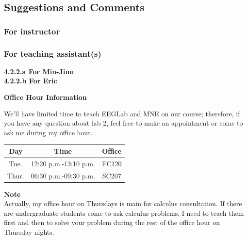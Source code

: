 \documentclass[a4 paper]{article}
\begin{document}
\subsection{Suggestions and Comments}
\subsubsection{For instructor}
\subsubsection{For teaching assistant(s)}
\textbf{4.2.2.a For Min-Jiun}\\
\textbf{4.2.2.b For Eric}\\
\noindent{\color{LightRubineRed} \rule{\linewidth}{0.5mm}}
\begin{center}
    \large{\textbf{Office Hour Information}}
\end{center}
\par We'll have limited time to teach EEGLab and MNE on our course; therefore, if you have any question about lab 2, feel free to make an appointment or come to ask me during my office hour.\\
\begin{center}
    \begin{tabular}{||c|c|c||}
    \hline
    Day & Time & Office\\
        \hline\hline
          Tue. & 12:20 p.m.-13:10 p.m. & EC120 \\
          \hline
          Thur. & 06:30 p.m.-09:30 p.m. & SC207\\
          \hline
    \end{tabular}
\end{center}
\textbf{Note}\\
Actually, my office hour on Thursdays is main for calculus consultation. If there are undergraduate students come to ask calculus problems, I need to teach them first and then to solve your problem during the rest of the office hour on Thursday nights.\\
\noindent{\color{LightRubineRed} \rule{\linewidth}{0.5mm}}
\end{document}
